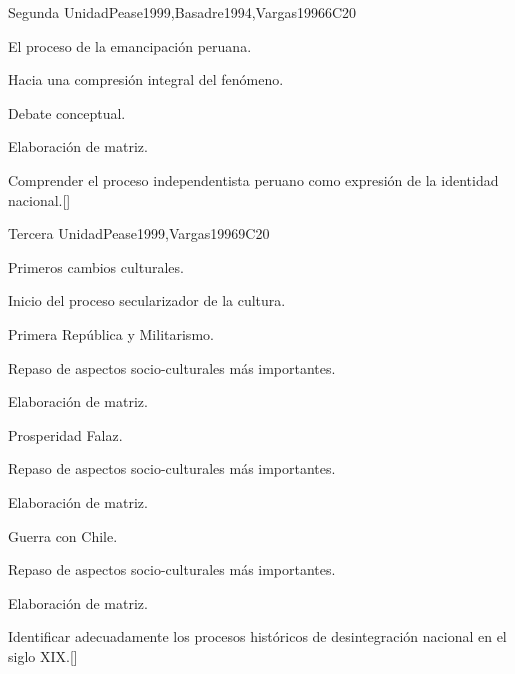 \begin{syllabus}
\begin{unit}{}{Segunda Unidad}{Pease1999,Basadre1994,Vargas1996}{6}{C20}
\begin{topics}
	\item El proceso de la emancipación peruana.
	\item Hacia una compresión integral del fenómeno.
	\item Debate conceptual.
	\item Elaboración de matriz.
\end{topics}
\begin{learningoutcomes}
	\item Comprender el proceso independentista peruano como expresión de la identidad nacional.[\Familiarity]
\end{learningoutcomes}
\end{unit}

\begin{unit}{}{Tercera Unidad}{Pease1999,Vargas1996}{9}{C20}
\begin{topics}
	\item Primeros cambios culturales.
	    \begin{subtopics}
		\item Inicio del proceso secularizador de la cultura.
		\item Primera República y Militarismo.
		\item Repaso de  aspectos socio-culturales más importantes.
		\item Elaboración de matriz.
	    \end{subtopics}
	\item Prosperidad Falaz.
	    \begin{subtopics}
		\item Repaso de  aspectos socio-culturales más importantes.
		\item Elaboración de matriz.
	     \end{subtopics}
	\item Guerra con Chile.
	      \begin{subtopics}
		\item Repaso de  aspectos socio-culturales más importantes.
		\item Elaboración de matriz.	
	    \end{subtopics}
\end{topics}
\begin{learningoutcomes}
	\item Identificar adecuadamente los procesos históricos de desintegración nacional en el siglo XIX.[\Familiarity]
\end{learningoutcomes}
\end{unit}


\end{syllabus}
